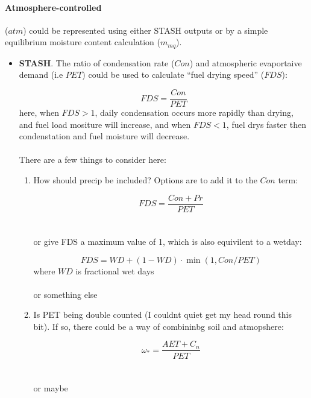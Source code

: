 \begin{shaded}
\paragraph{Atmosphere-controlled} ($atm$) could be represented using either STASH outputs or by a simple equilibrium moisture content calculation ($m_{mq}$).
\begin{itemize}

\item \textbf{STASH}. The ratio of condensation rate ($Con$) and atmospheric evaportaive demand (i.e $PET$) could be used to calculate ``fuel drying speed'' ($FDS$):

    \begin{equation}
        FDS = \frac{Con}{PET}
    \end{equation}
    here, when $FDS>1$, daily condensation occurs more rapidly than drying, and fuel load mositure will increase, and when $FDS<1$, fuel drys faster then condenstation and fuel moisture will decrease. \\
    \\
    There are a few things to consider here:

    \begin{enumerate}
        \item How should precip be included? Options are to add it to the $Con$ term:

        \begin{equation}
            FDS = \frac{Con + Pr}{PET}
        \end{equation}
        \\
        \\
        or give FDS a maximum value of 1, which is also equivilent to a wetday:

        \begin{equation}
            FDS = WD + (1 - WD) \cdot \min(1, Con/PET)
        \end{equation}
        where $WD$ is fractional wet days
        \\
        \\
        or something else

        \item Is PET being double counted (I couldnt quiet get my head round this bit). If so, there could be a way of combininbg soil and atmopshere:

        \begin{equation}
            \omega_{*} = \frac{AET + C_n}{PET}
        \end{equation}
        \\
        \\
        or maybe


\end{enumerate}
\end{itemize}
\end{shaded}
